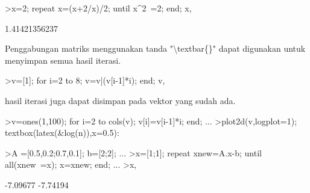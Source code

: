 \documentclass[a4paper,10pt]{article}
\begin{document}
\begin{eulernotebook}
\begin{eulercomment}
\begin{eulercomment}
\begin{eulercomment}
\begin{eulercomment}
\begin{eulercomment}
\begin{eulercomment}
\begin{eulercomment}
\begin{eulercomment}
\begin{eulercomment}
\begin{eulercomment}
\begin{eulercomment}
\begin{eulercomment}
\begin{eulercomment}
\begin{eulercomment}
\begin{eulercomment}
\begin{eulercomment}
\begin{eulercomment}
\begin{eulercomment}
\begin{eulercomment}
\begin{eulercomment}
\begin{eulercomment}
\begin{eulercomment}
\begin{eulercomment}
\begin{eulercomment}
\begin{eulercomment}
\begin{eulercomment}
\begin{eulercomment}
\begin{eulercomment}
\begin{eulercomment}
\begin{eulercomment}
\begin{eulercomment}
\begin{eulercomment}
\begin{eulercomment}
\begin{eulercomment}
\begin{eulerprompt}
>x=2; repeat x=(x+2/x)/2; until x^2~=2; end; x,
\end{eulerprompt}
\begin{euleroutput}
  1.41421356237
\end{euleroutput}
\begin{eulercomment}
Penggabungan matriks menggunakan tanda "\textbackslash{}textbar\{\}" dapat digunakan
untuk menyimpan semua hasil iterasi.
\end{eulercomment}
\begin{eulerprompt}
>v=[1]; for i=2 to 8; v=v|(v[i-1]*i); end; v,
\end{eulerprompt}
\begin{euleroutput}
  [1,  2,  6,  24,  120,  720,  5040,  40320]
\end{euleroutput}
\begin{eulercomment}
hasil iterasi juga dapat disimpan pada vektor yang sudah ada.
\end{eulercomment}
\begin{eulerprompt}
>v=ones(1,100); for i=2 to cols(v); v[i]=v[i-1]*i; end; ...
>plot2d(v,logplot=1); textbox(latex(&log(n)),x=0.5):
\end{eulerprompt}
\begin{eulerprompt}
>A =[0.5,0.2;0.7,0.1]; b=[2;2]; ...
>x=[1;1]; repeat xnew=A.x-b; until all(xnew~=x); x=xnew; end; ...
>x,
\end{eulerprompt}
\begin{euleroutput}
       -7.09677 
       -7.74194 
\end{euleroutput}
\begin{eulercomment}
\begin{eulercomment}

\end{eulercomment}
\end{eulercomment}
\end{eulercomment}
\end{eulercomment}
\end{eulercomment}
\end{eulercomment}
\end{eulercomment}
\end{eulercomment}
\end{eulercomment}
\end{eulercomment}
\end{eulercomment}
\end{eulercomment}
\end{eulercomment}
\end{eulercomment}
\end{eulercomment}
\end{eulercomment}
\end{eulercomment}
\end{eulercomment}
\end{eulercomment}
\end{eulercomment}
\end{eulercomment}
\end{eulercomment}
\end{eulercomment}
\end{eulercomment}
\end{eulercomment}
\end{eulercomment}
\end{eulercomment}
\end{eulercomment}
\end{eulercomment}
\end{eulercomment}
\end{eulercomment}
\end{eulercomment}
\end{eulercomment}
\end{eulercomment}
\end{eulercomment}
\end{eulercomment}
\end{eulernotebook}
\end{document}
